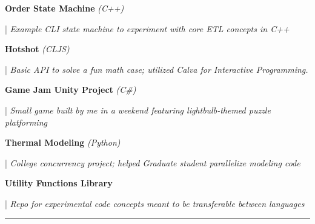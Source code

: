 \documentclass[letterpaper,11pt]{article}
\begin{document}
\begin{minipage}[t]{0.28\textwidth}
	\raggedright
	\textbf{ Order State Machine }\textit{(C++)}\\
\end{minipage}
\hfill
\begin{minipage}[t]{0.70\textwidth}
	\raggedright
	|\textit{ Example CLI state machine to experiment with core ETL concepts in C++ } \\
\end{minipage}

\begin{minipage}[t]{0.28\textwidth}
	\raggedright
	\textbf{ Hotshot }\textit{(CLJS)}\\
\end{minipage}
\hfill
\begin{minipage}[t]{0.70\textwidth}
	\raggedright
	|\textit{ Basic API to solve a fun math case; utilized Calva for Interactive Programming.  } \\
\end{minipage}

\begin{minipage}[t]{0.28\textwidth}
	\raggedright
	\textbf{ Game Jam Unity Project }\textit{(C\#)} \\
\end{minipage}
\hfill
\begin{minipage}[t]{0.70\textwidth}
	\raggedright
	|\textit{ Small game built by me in a weekend featuring lightbulb-themed puzzle platforming} \\
\end{minipage}

\begin{minipage}[t]{0.28\textwidth}
	\raggedright
	\textbf{ Thermal Modeling }\textit{(Python)}\\
\end{minipage}
\hfill
\begin{minipage}[t]{0.70\textwidth}
	\raggedright
	|\textit{ College concurrency project; helped Graduate student parallelize modeling code } \\
\end{minipage}

\begin{minipage}[t]{0.28\textwidth}
	\raggedright
	\textbf{ Utility Functions Library } \\
\end{minipage}
\hfill
\begin{minipage}[t]{0.70\textwidth}
	\raggedright
	|\textit{ Repo for experimental code concepts meant to be transferable between languages } \\
\end{minipage}
\noindent\rule{19.5cm}{0.4pt}
\end{document}
